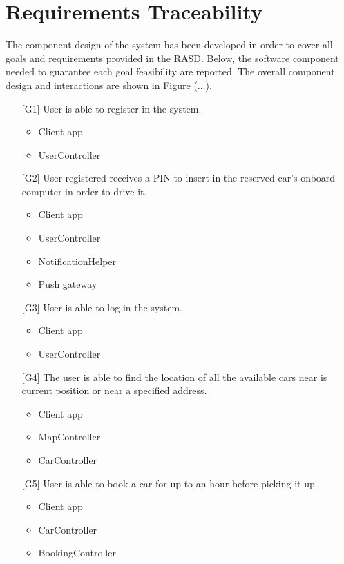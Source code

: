\chapter{Requirements Traceability}
The component design of the system has been developed in order to cover all goals and requirements provided in the RASD. Below, the software component needed to guarantee each goal feasibility are reported.
The overall component design and interactions are shown in Figure (...).

\begin{itemize}
	\item[{[G1]}] User is able to register in the system.
		\begin{itemize}
			\item Client app
			\item UserController
		\end{itemize}
	\item[{[G2]}] User registered receives a PIN to insert in the reserved car's onboard computer in order to drive it.
		\begin{itemize}
			\item Client app
			\item UserController
			\item NotificationHelper
			\item Push gateway
		\end{itemize}
	\item[{[G3]}] User is able to log in the system.
		\begin{itemize}
			\item Client app
			\item UserController
		\end{itemize}
	\item[{[G4]}] The user is able to find the location of all the available cars near is current position or near a specified address.
		\begin{itemize}
			\item Client app
			\item MapController
			\item CarController
		\end{itemize}
	\item[{[G5]}] User is able to book a car for up to an hour before picking it up.
		\begin{itemize}
			\item Client app
			\item CarController
			\item BookingController

\end{itemize}
\end{itemize}
